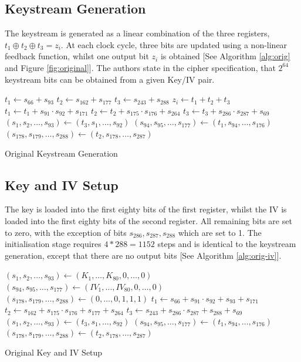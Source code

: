 \documentclass[conference]{IEEEtran}
\begin{document}
\subsection{Keystream Generation}\label{sec:key-gen-o}
The keystream is generated as a linear combination of the three registers, $t_1\oplus t_2\oplus t_3=z_i$. At each clock cycle, three bits are updated using a non-linear feedback function, whilst one output bit $z_i$ is obtained [See Algorithm \ref{alg:orig} and Figure \ref{fig:original}]. The authors state in the cipher specification, that $2^{64}$ keystream bits can be obtained from a given Key/IV pair.

\begin{algorithm}[H]
\begin{algorithmic}[1]
 
\State $t_1 \gets s_{66} + s_{93}$
\State $t_2 \gets s_{162} + s_{177}$
\State $t_3 \gets s_{243} + s_{288}$
\State
\State $z_i \gets t_1 + t_2 + t_3$
\State
\State $t_1 \gets t_1 + s_{91} \cdot s_{92} + s_{171}$
\State $t_2 \gets t_2 + s_{175} \cdot s_{176} + s_{264}$
\State $t_3 \gets t_3 + s_{286} \cdot s_{287} + s_{69}$
\State
\State $(s_1,s_2,\dots,s_{93}) \gets (t_3,s_1,\dots,s_{92})$
\State $(s_{94},s_{95},\dots,s_{177}) \gets (t_1,s_{94},\dots,s_{176})$
\State $(s_{178},s_{179},\dots,s_{288}) \gets (t_2,s_{178},\dots,s_{287})$
\EndFor
\end{algorithmic}
\caption{Original Keystream Generation}\label{alg:orig}
\end{algorithm}

\subsection{Key and IV Setup}\label{sec:key-iv-o}
The key is loaded into the first eighty bits of the first register, whilst the IV is loaded into the first eighty bits of the second register. All remaining bits are set to zero, with the exception of bits $s_{286},s_{287},s_{288}$ which are set to 1. The initialisation stage requires $4*288=1152$ steps and is identical to the keystream generation, except that there are no output bits [See Algorithm \ref{alg:orig-iv}].

\begin{algorithm}[H]
\begin{algorithmic}[1]
\State $(s_1,s_2,\dots,s_{93}) \gets (K_1,\dots,K_{80},0,\dots,0)$
\State $(s_{94},s_{95},\dots,s_{177}) \gets (IV_1,\dots,IV_{80},0,\dots,0)$
\State $(s_{178},s_{179},\dots,s_{288}) \gets (0,\dots,0,1,1,1)$
\State
{}
\State $t_1 \gets s_{66} + s_{91} \cdot s_{92} + s_{93} + s_{171}$
\State $t_2 \gets s_{162} + s_{175} \cdot s_{176} + s_{177} + s_{264}$
\State $t_3 \gets s_{243} + s_{286} \cdot s_{287} + s_{288}+ s_{69}$
\State
\State $(s_1,s_2,\dots,s_{93}) \gets (t_3,s_1,\dots,s_{92})$
\State $(s_{94},s_{95},\dots,s_{177}) \gets (t_1,s_{94},\dots,s_{176})$
\State $(s_{178},s_{179},\dots,s_{288}) \gets (t_2,s_{178},\dots,s_{287})$
\EndFor
\end{algorithmic}
\caption{Original Key and IV Setup}\label{alg:orig-iv}
\end{algorithm}
\end{document}
